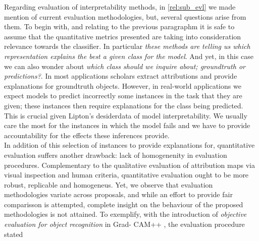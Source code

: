 \noindent Regarding evaluation of interpretability methods, in \autoref{rel:sub_evl} we made mention 
of current evaluation methodologies, but, several questions arise from them. To begin with, and                                                                                                          
relating to the previous paragraphm it is safe to assume that the quantitative metrics presented 
are taking into consideration relevance towards the classifier. In particular \emph{these 
methods are telling us which representation explains the best a given class for the model}. 
And yet, in this case we can also wonder about \emph{which class should we inquire about; groundtruth
 or predictions?}. In most applications scholars extract attributions and provide explanations for 
groundtruth objects. However, in real-world applications we expect models to predict incorrectly some 
instances in the task that they are given; these instances then require explanations for the class 
being predicted. This is crucial given Lipton's desiderdata of model interpretability. We usually 
care the most for the instances in which the model fails and we have to provide accountability 
for the effects these inferences provide.\\

\noindent In addition of this selection of instances to provide explanations for, quantitative 
evaluation suffers another drawback: lack of homogenenity in evaluation procedures. Complementary 
to the qualitative evaluation of attribution maps via visual inspection and human criteria, 
quantitative evaluation ought to be more robust, replicable and homogeneus. Yet, we observe that 
evaluation methodologies variate across proposals, and while an effort to provide fair comparisson 
is attempted, complete insight on the behaviour of the proposed methodologies is not attained. 
To exemplify, with the introduction of \emph{objective evaluation for object recognition} in Grad-
CAM++ \autocite{chattopadhay2018grad}, the evaluation procedure stated 
